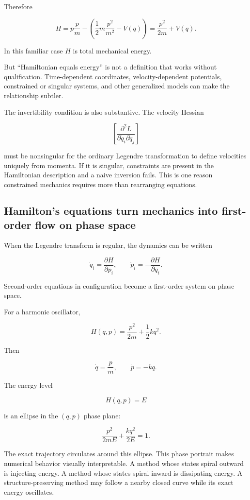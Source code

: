 Therefore

\[
H
=
p\frac pm
-
\left(
\frac12m\frac{p^2}{m^2}
-
V(q)
\right)
=
\boxed{
\frac{p^2}{2m}+V(q)
}.
\]

In this familiar case \(H\) is total mechanical energy.

But ``Hamiltonian equals energy'' is not a definition that works without qualification. Time-dependent coordinates, velocity-dependent potentials, constrained or singular systems, and other generalized models can make the relationship subtler.

The invertibility condition is also substantive. The velocity Hessian

\[
\left[
\frac{\partial^2L}
{\partial\dot q_i\partial\dot q_j}
\right]
\]

must be nonsingular for the ordinary Legendre transformation to define velocities uniquely from momenta. If it is singular, constraints are present in the Hamiltonian description and a naive inversion fails. This is one reason constrained mechanics requires more than rearranging equations.

\subsection{Hamilton's equations turn mechanics into first-order flow on phase space}\label{02-foundations-ii-ch025-hamiltons-equations-turn-mechanics-into-first-order-flow-on-phase-space}

When the Legendre transform is regular, the dynamics can be written

\[
\boxed{
\dot q_i
=
\frac{\partial H}{\partial p_i},
\qquad
\dot p_i
=
-
\frac{\partial H}{\partial q_i}
}.
\]

Second-order equations in configuration become a first-order system on phase space.

For a harmonic oscillator,

\[
H(q,p)
=
\frac{p^2}{2m}
+
\frac12kq^2.
\]

Then

\[
\dot q=\frac pm,
\qquad
\dot p=-kq.
\]

The energy level

\[
H(q,p)=E
\]

is an ellipse in the \((q,p)\) phase plane:

\[
\frac{p^2}{2mE}
+
\frac{kq^2}{2E}
=
1.
\]

The exact trajectory circulates around this ellipse. This phase portrait makes numerical behavior visually interpretable. A method whose states spiral outward is injecting energy. A method whose states spiral inward is dissipating energy. A structure-preserving method may follow a nearby closed curve while its exact energy oscillates.

